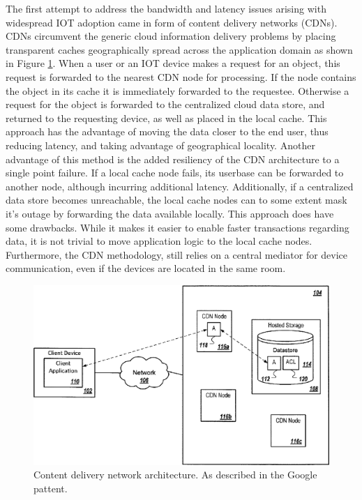 The first attempt to address the bandwidth and latency issues arising with widespread IOT adoption came in form of content delivery networks (CDNs).\cite{gagliardi2011content}
CDNs circumvent the generic cloud information delivery problems by placing transparent caches geographically spread across the application domain as shown in Figure \ref{lit:fig:2}.
When a user or an IOT device makes a request for an object, this request is forwarded to the nearest CDN node for processing.
If the node contains the object in its cache it is immediately forwarded to the requestee.
Otherwise a request for the object is forwarded to the centralized cloud data store, and returned to the requesting device, as well as placed in the local cache.
This approach has the advantage of moving the data closer to the end user, thus reducing latency, and taking advantage of geographical locality.
Another advantage of this method is the added resiliency of the CDN architecture to a single point failure.
If a local cache node fails, its userbase can be forwarded to another node, although incurring additional latency.
Additionally, if a centralized data store becomes unreachable, the local cache nodes can to some extent mask it's outage by forwarding the data available locally.
This approach does have some drawbacks.
While it makes it easier to enable faster transactions regarding data, it is not trivial to move application logic to the local cache nodes.
Furthermore, the CDN methodology, still relies on a central mediator for device communication, even if the devices are located in the same room.

\begin{figure}[h]
    \centering
    \includegraphics[width=0.6\linewidth]{img/cdn.png}
    \caption{Content delivery network architecture.
    As described in the Google pattent.\cite{gagliardi2011content}}
    \label{lit:fig:2}
\end{figure}

